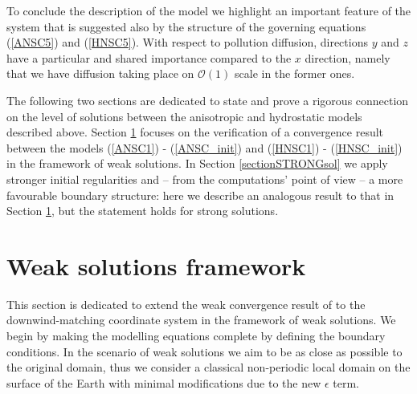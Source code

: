 \documentclass[11pt, a4paper]{article}
\begin{document}
To conclude the description of the model we highlight an important feature of the system that is suggested also by the structure of the governing equations (\ref{ANSC5}) and (\ref{HNSC5}). With respect to pollution diffusion, directions $y$ and $z$ have a particular and shared importance compared to the $x$ direction, namely that we have diffusion taking place on $\mathcal{O}(1)$ scale in the former ones. 

The following two sections are dedicated to state and prove a rigorous connection on the level of solutions between the anisotropic and hydrostatic models described above. Section \ref{sectionWS} focuses on the verification of a convergence result between the models (\ref{ANSC1}) - (\ref{ANSC_init}) and (\ref{HNSC1}) - (\ref{HNSC_init}) in the framework of weak solutions. In Section \ref{sectionSTRONGsol} we apply stronger initial regularities and -- from the computations' point of view -- a more favourable boundary structure: here we describe an analogous result to that in Section \ref{sectionWS}, but the statement holds for strong solutions.

\section{Weak solutions framework} \label{sectionWS}

This section is dedicated to extend the weak convergence result of \cite{pollatmws2019} to the downwind-matching coordinate system in the framework of weak solutions. We begin by making the modelling equations complete by defining the boundary conditions. In the scenario of weak solutions we aim to be as close as possible to the original domain, thus we consider a classical non-periodic local domain on the surface of the Earth with minimal modifications due to the new $\epsilon$ term.
\end{document}
